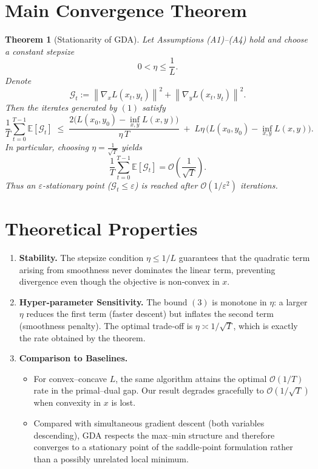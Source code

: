 \documentclass{article}
\newtheorem{theorem}{Theorem}
\newcommand{\E}{\mathbb{E}}
\newcommand{\norm}[1]{\left\| #1 \right\|}
\begin{document}
\section*{Main Convergence Theorem}
\begin{theorem}[Stationarity of GDA]\label{thm:main}
Let Assumptions (A1)–(A4) hold and choose a constant stepsize
\[
0<\eta\le \frac{1}{L}.
\]
Denote
\[
\mathcal{G}_t:=\norm{\nabla_{x}L(x_t,y_t)}^{2}+\norm{\nabla_{y}L(x_t,y_t)}^{2}.
\]
Then the iterates generated by \((1)\) satisfy
\[
\frac{1}{T}\sum_{t=0}^{T-1}\E[\mathcal{G}_t]
\;\le\;
\frac{2\big(L(x_0,y_0)-\inf_{x,y}L(x,y)\big)}{\eta\,T}
\;+\;
L\eta\,\big(L(x_0,y_0)-\inf_{x,y}L(x,y)\big).
\tag{3}
\]
In particular, choosing \(\eta=\frac{1}{\sqrt{T}}\) yields
\[
\frac{1}{T}\sum_{t=0}^{T-1}\E[\mathcal{G}_t]=
\mathcal{O}\!\left(\frac{1}{\sqrt{T}}\right).
\]
Thus an \(\varepsilon\)-stationary point (\(\mathcal{G}_t\le\varepsilon\)) is reached after
\(\mathcal{O}(1/\varepsilon^{2})\) iterations.
\end{theorem}

\section*{Theoretical Properties}
\begin{enumerate}
\item \textbf{Stability.} The stepsize condition \(\eta\le1/L\) guarantees that the
quadratic term arising from smoothness never dominates the linear term, preventing divergence even though the objective is non‑convex in \(x\).
\item \textbf{Hyper‑parameter Sensitivity.} The bound \((3)\) is monotone in \(\eta\):
a larger \(\eta\) reduces the first term (faster descent) but inflates the second term (smoothness penalty). The optimal trade‑off is \(\eta\asymp 1/\sqrt{T}\), which is exactly the rate obtained by the theorem.
\item \textbf{Comparison to Baselines.}
\begin{itemize}
\item For convex–concave \(L\), the same algorithm attains the optimal
\(\mathcal{O}(1/T)\) rate in the primal–dual gap. Our result degrades gracefully to
\(\mathcal{O}(1/\sqrt{T})\) when convexity in \(x\) is lost.
\item Compared with simultaneous gradient descent (both variables descending), GDA respects the max–min structure and therefore converges to a stationary point of the saddle‑point formulation rather than a possibly unrelated local minimum.
\end{itemize}
\end{enumerate}
\end{document}
